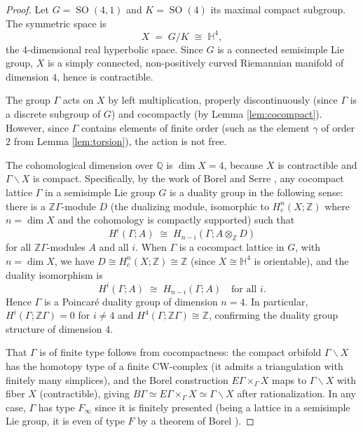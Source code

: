 \documentclass[12pt]{article}
\theoremstyle{definition}
\DeclareMathOperator{\SO}{SO}
\begin{document}
\begin{proof}
Let $G = \SO(4,1)$ and $K = \SO(4)$ its maximal compact subgroup.  The symmetric
space is
\[
  X \;=\; G/K \;\cong\; \mathbb{H}^4,
\]
the $4$-dimensional real hyperbolic space.  Since $G$ is a connected semisimple Lie group,
$X$ is a simply connected, non-positively curved Riemannian manifold of dimension $4$,
hence is contractible.

The group $\Gamma$ acts on $X$ by left multiplication, properly discontinuously (since
$\Gamma$ is a discrete subgroup of $G$) and cocompactly (by Lemma \ref{lem:cocompact}).
However, since $\Gamma$ contains elements of finite order (such as the element $\gamma$ of
order $2$ from Lemma \ref{lem:torsion}), the action is not free.

The cohomological dimension over $\mathbb{Q}$ is $\dim X = 4$, because $X$ is contractible
and $\Gamma \backslash X$ is compact.  Specifically, by the work of Borel and Serre
\cite{BorelSerre1973}, any cocompact lattice $\Gamma$ in a semisimple Lie group $G$ is a
duality group in the following sense: there is a $\mathbb{Z}\Gamma$-module $D$ (the
dualizing module, isomorphic to $H^n_c(X; \mathbb{Z})$ where $n = \dim X$ and the
cohomology is compactly supported) such that
\[
  H^i(\Gamma; A) \;\cong\; H_{n-i}(\Gamma; A \otimes_\mathbb{Z} D)
\]
for all $\mathbb{Z}\Gamma$-modules $A$ and all $i$.  When $\Gamma$ is a cocompact
lattice in $G$, with $n = \dim X$, we have $D \cong H^n_c(X; \mathbb{Z}) \cong \mathbb{Z}$
(since $X \cong \mathbb{H}^4$ is orientable), and the duality isomorphism is
\[
  H^i(\Gamma; A) \;\cong\; H_{n-i}(\Gamma; A) \quad \text{for all } i.
\]
Hence $\Gamma$ is a Poincar\'e duality group of dimension $n = 4$.  In particular,
$H^i(\Gamma; \mathbb{Z}\Gamma) = 0$ for $i \neq 4$ and $H^4(\Gamma; \mathbb{Z}\Gamma) \cong \mathbb{Z}$,
confirming the duality group structure of dimension $4$.

That $\Gamma$ is of finite type follows from cocompactness: the compact orbifold
$\Gamma \backslash X$ has the homotopy type of a finite $\mathrm{CW}$-complex (it admits a
triangulation with finitely many simplices), and the Borel construction
$E\Gamma \times_\Gamma X$ maps to $\Gamma \backslash X$ with fiber $X$ (contractible),
giving $B\Gamma \simeq E\Gamma \times_\Gamma X \simeq \Gamma \backslash X$ after
rationalization.  In any case, $\Gamma$ has type $F_\infty$ since it is finitely presented
(being a lattice in a semisimple Lie group, it is even of type $F$ by a theorem of Borel
\cite{Borel1976}).
\end{proof}
\end{document}
